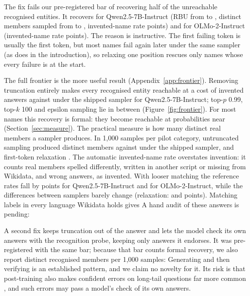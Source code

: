 \documentclass[11pt]{article}
\begin{document}
The fix fails our pre-registered bar of recovering half of the unreachable recognised entities. It recovers \pfRecoveredQwen{} for Qwen2.5-7B-Instruct (RBU from \pfQwenRefRbu{} to \pfQwenRelaxRbu{}, distinct members sampled from \pfQwenRefDistinct{} to \pfQwenRelaxDistinct{}, invented-name rate \pfInvDeltaQwen{} points) and \pfRecoveredOlmo{} for OLMo-2-Instruct (invented-name rate \pfInvDeltaOlmo{} points). The reason is instructive. The first failing token is usually the first token, but most names fail again later under the same sampler (as \cwLaterExName{} does in the introduction), so relaxing one position rescues only names whose every failure is at the start.

The full frontier is the more useful result (Appendix~\ref{app:frontier}). Removing truncation entirely makes every recognised entity reachable at a cost of \pfQwenUntrInv{} invented answers against \pfQwenRefInv{} under the shipped sampler for Qwen2.5-7B-Instruct; top-$p$ 0.99, top-$k$ 100 and epsilon sampling lie in between (Figure~\ref{fig:frontier}). For most names this recovery is formal: they become reachable at probabilities near \ztMedQQI{} (Section~\ref{sec:measure}). The practical measure is how many distinct real members a sampler produces. In 1{,}000 samples per pilot category, untruncated sampling produced \pfQwenUntrDistinct{} distinct members against \pfQwenRefDistinct{} under the shipped sampler, and first-token relaxation \pfQwenRelaxDistinct{}. The automatic invented-name rate overstates invention: it counts real members spelled differently, written in another script or missing from Wikidata, and wrong answers, as invented. With looser matching the reference rates fall by \pfLooseDropQwen{} points for Qwen2.5-7B-Instruct and \pfLooseDropOlmo{} for OLMo-2-Instruct, while the differences between samplers barely change (relaxation: \pfLooseDeltaQwen{} and \pfLooseDeltaOlmo{} points). Matching labels in every language Wikidata holds gives \pdInventedMultilingual{} A hand audit of these answers is pending: \pdAuditInvented{}

A second fix keeps truncation out of the answer and lets the model check its own answers with the recognition probe, keeping only answers it endorses. It was pre-registered with the same bar; because that bar counts formal recovery, we also report distinct recognised members per 1{,}000 samples: \pdSelfCheckFix{} Generating and then verifying is an established pattern, and we claim no novelty for it. Its risk is that post-training also makes confident errors on long-tail questions far more common \citep{huang2026alignment}, and such errors may pass a model's check of its own answers.
\end{document}

